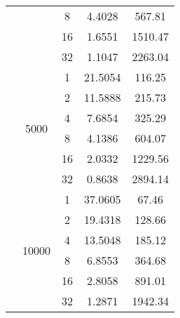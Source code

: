 \begin{tabularx}{\textwidth}{@{} c c c c c @{}}
                            &                       & 8  & 4.4028  & 567.81  \\
                            &                       & 16 & 1.6551  & 1510.47 \\
                            &                       & 32 & 1.1047  & 2263.04 \\
                            \cmidrule{2-5}
                            & \multirow{6}{*}{5000} & 1  & 21.5054 & 116.25  \\
                            &                       & 2  & 11.5888 & 215.73  \\
                            &                       & 4  & 7.6854  & 325.29  \\
                            &                       & 8  & 4.1386  & 604.07  \\
                            &                       & 16 & 2.0332  & 1229.56 \\
                            &                       & 32 & 0.8638  & 2894.14 \\
                            \cmidrule{2-5}
                            & \multirow{6}{*}{10000} & 1  & 37.0605 & 67.46   \\
                            &                        & 2  & 19.4318 & 128.66  \\
                            &                        & 4  & 13.5048 & 185.12  \\
                            &                        & 8  & 6.8553  & 364.68  \\
                            &                        & 16 & 2.8058  & 891.01  \\
                            &                        & 32 & 1.2871  & 1942.34 \\
\bottomrule
\end{tabularx}
